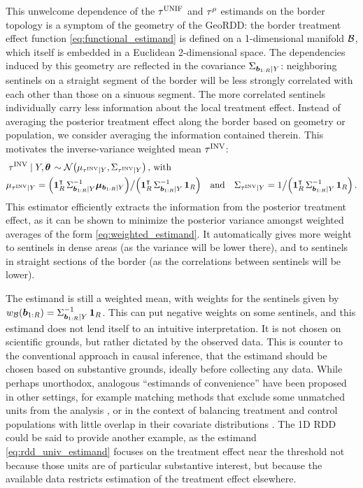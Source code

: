 This unwelcome dependence of the \(\tau^{\mathrm{UNIF}}\) and \(\tau^{\rho}\) estimands on the border topology is a symptom of the geometry of the GeoRDD: the border treatment effect function \autoref{eq:functional_estimand} is defined on a 1-dimensional manifold \(\mathcal{B}\), which itself is embedded in a Euclidean 2-dimensional space.
The dependencies induced by this geometry are reflected in the covariance \(\Sigma_{\bm{b}_{1:R} \mid Y}\): neighboring sentinels on a straight segment of the border will be less strongly correlated with each other than those on a sinuous segment.
The more correlated sentinels individually carry less information about the local treatment effect.
Instead of averaging the posterior treatment effect along the border based on geometry or population, we consider averaging the information contained therein.
This motivates the inverse-variance weighted mean \(\tau^{\mathrm{INV}}\):
\begin{equation}
    \begin{split}
        & \left. \invvar \mid Y, \hyperparam \right. \sim \normal\del{\mu_{\invvar \mid Y}, \Sigma_{\invvar \mid Y}} \,\text{, with} \\
        & \mu_{\invvar \mid Y} = \del{\ones_{\numsent}\trans \Sigma_{\sentinels \mid Y}^{-1} \muvec_{\sentinels \mid Y}} \big/ \del{\ones_{\numsent}\trans \Sigma_{\sentinels \mid Y}^{-1} \ones_{\numsent}} \quad\text{and}\quad
        \Sigma_{\invvar \mid Y} = 1 \big/ \del{\ones_{\numsent}\trans \Sigma_{\sentinels \mid Y}^{-1} \ones_{\numsent}} \,.
    \end{split}
    \label{eq:invvar}
\end{equation}
This estimator efficiently extracts the information from the posterior treatment effect, as it can be shown to minimize the posterior variance amongst weighted averages of the form \autoref{eq:weighted_estimand}.
It automatically gives more weight to sentinels in dense areas (as the variance will be lower there), and to sentinels in straight sections of the border (as the correlations between sentinels will be lower).

The estimand is still a weighted mean, with weights for the sentinels given by \(w_{\mathcal{B}}(\bm{b}_{1:R}) = \Sigma_{\bm{b}_{1:R} \mid Y}^{-1} \operatorname{\mathbf{1}}_{R}\).
This can put negative weights on some sentinels, and this estimand does not lend itself to an intuitive interpretation.
It is not chosen on scientific grounds, but rather dictated by the observed data.
This is counter to the conventional approach in causal inference, that the estimand should be chosen based on substantive grounds, ideally before collecting any data.
While perhaps unorthodox, analogous ``estimands of convenience'' have been proposed in other settings, for example matching methods that exclude some unmatched units from the analysis \citep[discussed in][]{crump2009dealing}, or in the context of balancing treatment and control populations with little overlap in their covariate distributions \citep{li2016balancing}.
The 1D RDD could be said to provide another example, as the estimand \autoref{eq:rdd_univ_estimand} focuses on the treatment effect near the threshold not because those units are of particular substantive interest, but because the available data restricts estimation of the treatment effect elsewhere.

